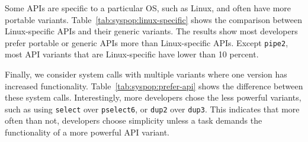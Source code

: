 Some APIs are specific to a particular OS,
such as Linux,
and often have more portable variants.
Table~\ref{tab:syspop:linux-specific} shows the comparison between
Linux-specific APIs and their generic variants.
The results show most developers prefer portable or generic APIs
more than Linux-specific APIs.
Except {\tt pipe2}, most API variants that are Linux-specific
have \unwusagemetric{} lower than 10 percent.

Finally, we consider system calls with multiple variants
where one version has increased functionality.
Table~\ref{tab:syspop:prefer-api} shows the difference %
between these system calls.
Interestingly, more developers chose the less powerful variants,
such as using {\tt select} over {\tt pselect6}, or {\tt dup2} over {\tt dup3}.
This indicates that more often than not, developers choose simplicity 
unless a task demands the functionality of a more powerful API variant.


